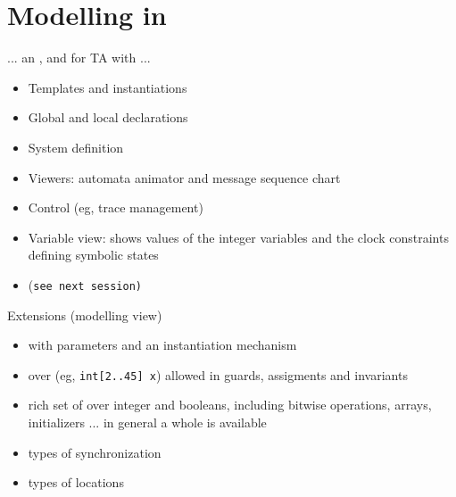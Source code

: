 \documentclass[aspectratio=169]{beamer}
\begin{document}
\section{Modelling in \uppaal}
\begin{slide}{\uppaal}
\small

... an ,   and  for TA with  ...

\vspace*{-3mm}
\begin{itemize}
\item \alert{Templates} and \alert{instantiations}
\item Global and local \alert{declarations}
\item \alert{System definition}
\end{itemize}

\vspace*{-3mm}
\begin{itemize}
\item Viewers: \alert{automata animator} and \alert{message sequence chart}
\item Control (eg, \alert{trace} management)
\item Variable view: shows values of the integer variables and the clock constraints defining symbolic states
\end{itemize}

\vspace*{-3mm}
\begin{itemize}
\item (\texttt{see next session)}
\end{itemize}

\end{slide}


\begin{slide}{Extensions (modelling view)}
\small

\begin{itemize}
\item {} with \alert{parameters} and an \alert{instantiation mechanism}
\item {} over  (eg, \texttt{int[2..45] x}) allowed in \alert{guards},
\alert{assigments} and \alert{invariants}
\item rich set of  over integer and booleans, including bitwise operations, arrays, initializers ... in general
a whole  is available
\item {} types of \alert{synchronization}
 \item {} types of \alert{locations}
\end{itemize}
\end{slide}
\end{document}
